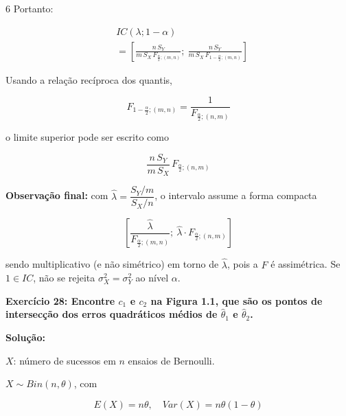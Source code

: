 \documentclass[8pt, a4paper, landscape]{extarticle}
\begin{document}
\begin{multicols}{6}
Portanto:

\begin{equation*}
\begin{split}
&IC(\lambda;1-\alpha) \\
&= \left[\frac{n\,S_Y}{m\,S_X\,F_{\frac{\alpha}{2};(m,n)}};\ \frac{n\,S_Y}{m\,S_X\,F_{1-\frac{\alpha}{2};(m,n)}}\right]
\end{split}
\end{equation*}

Usando a relação recíproca dos quantis,

\begin{equation*}
F_{1-\frac{\alpha}{2};(m,n)} = \frac{1}{F_{\frac{\alpha}{2};(n,m)}}
\end{equation*}

o limite superior pode ser escrito como

\begin{equation*}
\frac{n\,S_Y}{m\,S_X}\,F_{\frac{\alpha}{2};(n,m)}
\end{equation*}

\textbf{Observação final:} com $\hat{\lambda} = \dfrac{S_Y/m}{S_X/n}$, o intervalo assume a forma compacta

\begin{equation*}
\left[\frac{\hat{\lambda}}{F_{\frac{\alpha}{2};(m,n)}};\ \hat{\lambda}\cdot F_{\frac{\alpha}{2};(n,m)}\right]
\end{equation*}

sendo multiplicativo (e não simétrico) em torno de $\hat{\lambda}$, pois a $F$ é assimétrica. Se $1 \in IC$, não se rejeita $\sigma_X^2 = \sigma_Y^2$ ao nível $\alpha$.

\textbf{Exercício 28: Encontre $c_1$ e $c_2$ na Figura 1.1, que são os pontos de intersecção dos erros quadráticos médios de $\hat{\theta}_1$ e $\hat{\theta}_2$.}

\vspace{0.3cm}

\textbf{Solução:}

$X$: número de sucessos em $n$ ensaios de Bernoulli.

$X \sim Bin(n,\theta)$, com

\begin{equation*}
E(X) = n\theta, \quad Var(X) = n\theta(1-\theta)
\end{equation*}

\vspace{0.2cm}


\end{multicols}
\end{document}

